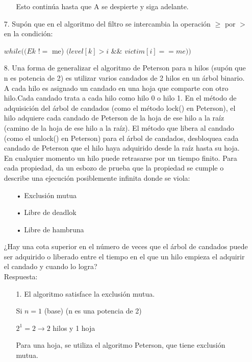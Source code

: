 \documentclass[12pt, letterpaper]{article}
\begin{document}
\begin{itemize}
\begin{itemize}
Esto contin\'ua hasta que A se despierte y siga adelante.

\end{itemize}

\item[7. ]Sup\'on que en el algoritmo del filtro se intercambia la operaci\'on $ \geqslant$ por $>$ en la condici\'on:

\begin{center}
 $while((Ek$ $!=$ me) $(level[k] > i$ \&\& $victim[i] == me))$
\end{center}

\item[8. ]Una forma de generalizar el algoritmo de Peterson para n hilos (sup\'on que n es potencia de 2) es utilizar varios candados de 2 hilos en un \'arbol binario.
A cada hilo es asignado un candado en una hoja que comparte con otro hilo.Cada candado trata a cada hilo como hilo 0 o hilo 1.
En el m\'etodo de adquisici\'on del \'arbol de candados (como el m\'etodo lock() en Peterson), el hilo adquiere cada candado de Peterson de la hoja de ese hilo a la ra\'iz (camino de la hoja de ese hilo a la ra\'iz). El m\'etodo que libera al candado (como el unlock() en Peterson) para el \'arbol de candados, desbloquea cada candado de Peterson que el hilo haya adquirido desde la ra\'iz hasta su hoja. En cualquier momento un hilo puede retrasarse por un tiempo finito. Para cada propiedad, da un esbozo de prueba que la propiedad se cumple o describe una ejecución posiblemente infinita donde se viola:
\begin{itemize}
\item[•] Exclusi\'on mutua
\item[•] Libre de deadlok
\item[•] Libre de hambruna
\end{itemize}
¿Hay una cota superior en el n\'umero de veces que el \'arbol de candados puede ser adquirido o liberado entre el tiempo en el que un hilo empieza el adquirir el candado y cuando lo logra?\\
Respuesta:\\
\begin{itemize}


\item[1. ]El algoritmo satisface la exclusi\'on mutua.

Si $n = 1$ (base) (n es una potencia de 2)

$2^{1} = 2 \rightarrow 2$ hilos y 1 hoja

Para una hoja, se utiliza el algoritmo Peterson, que tiene exclusi\'on mutua.


\end{itemize}
\end{itemize}
\end{document}
